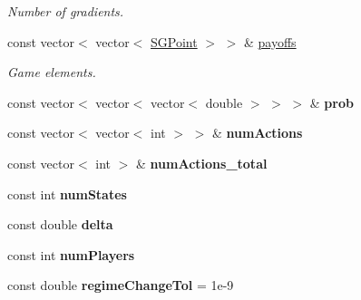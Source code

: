 \begin{DoxyCompactItemize}
\begin{DoxyCompactList}\small\item\em Number of gradients. \end{DoxyCompactList}\item 
\mbox{\label{classSGSolver__MaxMinMax__GRB_a387c932e6473bcf1b17e5703dddef301}} 
const vector$<$ vector$<$ \hyperlink{classSGPoint}{S\+G\+Point} $>$ $>$ \& \hyperlink{classSGSolver__MaxMinMax__GRB_a387c932e6473bcf1b17e5703dddef301}{payoffs}
\begin{DoxyCompactList}\small\item\em Game elements. \end{DoxyCompactList}\item 
\mbox{\label{classSGSolver__MaxMinMax__GRB_a48e8b438a3a3165eac8db7f74588b3fe}} 
const vector$<$ vector$<$ vector$<$ double $>$ $>$ $>$ \& {\bfseries prob}
\item 
\mbox{\label{classSGSolver__MaxMinMax__GRB_a6bcecc33a075a1ad4e6da6120045480d}} 
const vector$<$ vector$<$ int $>$ $>$ \& {\bfseries num\+Actions}
\item 
\mbox{\label{classSGSolver__MaxMinMax__GRB_aac169d7f44b0d6d73ff00b8b3642c9bb}} 
const vector$<$ int $>$ \& {\bfseries num\+Actions\+\_\+total}
\item 
\mbox{\label{classSGSolver__MaxMinMax__GRB_af06472af2198fd1dfff018aee40da0ca}} 
const int {\bfseries num\+States}
\item 
\mbox{\label{classSGSolver__MaxMinMax__GRB_ae6bd1e6a5998bc514aac57c1e9cff8ed}} 
const double {\bfseries delta}
\item 
\mbox{\label{classSGSolver__MaxMinMax__GRB_a80d09909bc21d4cd6afc5fbd71279a38}} 
const int {\bfseries num\+Players}
\item 
\mbox{\label{classSGSolver__MaxMinMax__GRB_abce31689aec99e00c4f93f29c8b0826e}} 
const double {\bfseries regime\+Change\+Tol} = 1e-\/9
\item 
\mbox{\label{classSGSolver__MaxMinMax__GRB_a30d481a7ff078d544f499aba9aec80c3}} 

\end{DoxyCompactItemize}
